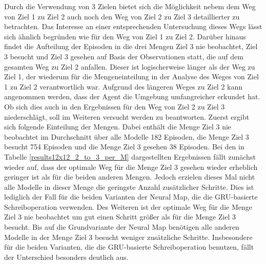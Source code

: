 Durch die Verwendung von 3 Zielen bietet sich die Möglichkeit nebem dem Weg von Ziel 1 zu Ziel 2 auch noch den Weg von Ziel 2 zu Ziel 3 detaillierter zu betrachten. Das Interesse an einer entsprechenden Untersuchung dieses Wegs lässt sich ähnlich begründen wie für den Weg von Ziel 1 zu Ziel 2. Darüber hinaus findet die Aufteilung der Episoden in die drei Mengen \glqq Ziel 3 nie beobachtet\grqq{}, \glqq Ziel 3 besucht\grqq{} und \glqq Ziel 3 gesehen\grqq{} auf Basis der Observationen statt, die auf dem gesamten Weg zu Ziel 2 anfallen. Dieser ist logischerweise länger als der Weg zu Ziel 1, der wiederum für die Mengeneinteilung in der Analyse des Weges von Ziel 1 zu Ziel 2 verantwortlich war. Aufgrund des längeren Weges zu Ziel 2 kann angenommen werden, dass der Agent die Umgebung umfangreicher erkundet hat. Ob sich dies auch in den Ergebnissen für den Weg von Ziel 2 zu Ziel 3 niederschlägt, soll im Weiteren versucht werden zu beantworten. Zuerst ergibt sich folgende Einteilung der Mengen. Dabei enthält die Menge \glqq Ziel 3 nie beobachtet\grqq{} im Durchschnitt über alle Modelle 182 Episoden, die Menge \glqq Ziel 3 besucht\grqq{} 754 Episoden und die Menge \glqq Ziel 3 gesehen\grqq{} 38 Episoden. Bei den in Tabelle \ref{results12x12_2_to_3_per_M} dargestellten Ergebnissen fällt zunächst wieder auf, dass der optimale Weg für die Menge \glqq Ziel 3 gesehen\grqq{} wieder erheblich geringer ist als für die beiden anderen Mengen. Jedoch erzielen dieses Mal nicht alle Modelle in dieser Menge die geringste Anzahl zusätzlicher Schritte. Dies ist lediglich der Fall für die beiden Varianten der Neural Map, die die GRU-basierte Schreiboperation verwenden. Des Weiteren ist der optimale Weg für die Menge \glqq Ziel 3 nie beobachtet\grqq{} um gut einen Schritt größer als für die Menge \glqq Ziel 3 besucht\grqq{}. Bis auf die Grundvariante der Neural Map benötigen alle anderen Modelle in der Menge \glqq Ziel 3 besucht\grqq{} weniger zusätzliche Schritte. Insbesondere für die beiden Varianten, die die GRU-basierte Schreiboperation benutzen, fällt der Unterschied besonders deutlich aus.


